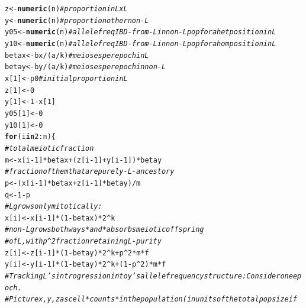 \documentclass{article}\usepackage[]{graphicx}\usepackage[]{color}
\makeatletter
\newcommand{\hlnum}[1]{\textcolor[rgb]{0.686,0.059,0.569}{#1}}%
\newcommand{\hlcom}[1]{\textcolor[rgb]{0.678,0.584,0.686}{\textit{#1}}}%
\newcommand{\hlopt}[1]{\textcolor[rgb]{0,0,0}{#1}}%
\newcommand{\hlstd}[1]{\textcolor[rgb]{0.345,0.345,0.345}{#1}}%
\newcommand{\hlkwa}[1]{\textcolor[rgb]{0.161,0.373,0.58}{\textbf{#1}}}%
\newcommand{\hlkwb}[1]{\textcolor[rgb]{0.69,0.353,0.396}{#1}}%
\newcommand{\hlkwd}[1]{\textcolor[rgb]{0.737,0.353,0.396}{\textbf{#1}}}%
\newenvironment{kframe}{%
 \def\at@end@of@kframe{}%
 \ifinner\ifhmode%
  \def\at@end@of@kframe{\end{minipage}}%
  \begin{minipage}{\columnwidth}%
 \fi\fi%
 \def\FrameCommand##1{\hskip\@totalleftmargin \hskip-\fboxsep
 \colorbox{shadecolor}{##1}\hskip-\fboxsep
     \hskip-\linewidth \hskip-\@totalleftmargin \hskip\columnwidth}%
 \MakeFramed {\advance\hsize-\width
   \@totalleftmargin\z@ \linewidth\hsize
   \@setminipage}}%
 {\par\unskip\endMakeFramed%
 \at@end@of@kframe}
\newenvironment{knitrout}{}{} %
\makeatother
\begin{document}
\begin{knitrout}
\begin{kframe}
\begin{alltt}
  \hlstd{z}   \hlkwb{<-} \hlkwd{numeric}\hlstd{(n)}    \hlcom{# proportion in LxL}
  \hlstd{y}   \hlkwb{<-} \hlkwd{numeric}\hlstd{(n)}    \hlcom{# proportion other non-L}
  \hlstd{y05} \hlkwb{<-} \hlkwd{numeric}\hlstd{(n)}    \hlcom{# allele freq IBD-from-L in non-L pop for a het position in L}
  \hlstd{y10} \hlkwb{<-} \hlkwd{numeric}\hlstd{(n)}    \hlcom{# allele freq IBD-from-L in non-L pop for a hom position in L}
  \hlstd{betax} \hlkwb{<-} \hlstd{bx}\hlopt{/}\hlstd{(a}\hlopt{/}\hlstd{k)}    \hlcom{# meioses per epoch in L}
  \hlstd{betay} \hlkwb{<-} \hlstd{by}\hlopt{/}\hlstd{(a}\hlopt{/}\hlstd{k)}    \hlcom{# meioses per epoch in non-L}
  \hlstd{x[}\hlnum{1}\hlstd{]}  \hlkwb{<-} \hlstd{p0}          \hlcom{# initial proportion in L}
  \hlstd{z[}\hlnum{1}\hlstd{]}  \hlkwb{<-} \hlnum{0}
  \hlstd{y[}\hlnum{1}\hlstd{]}  \hlkwb{<-} \hlnum{1}\hlopt{-}\hlstd{x[}\hlnum{1}\hlstd{]}
  \hlstd{y05[}\hlnum{1}\hlstd{]} \hlkwb{<-} \hlnum{0}
  \hlstd{y10[}\hlnum{1}\hlstd{]} \hlkwb{<-} \hlnum{0}
  \hlkwa{for}\hlstd{(i} \hlkwa{in} \hlnum{2}\hlopt{:}\hlstd{n)\{}
    \hlcom{# total meiotic fraction}
    \hlstd{m} \hlkwb{<-} \hlstd{x[i}\hlopt{-}\hlnum{1}\hlstd{]}\hlopt{*}\hlstd{betax} \hlopt{+} \hlstd{(z[i}\hlopt{-}\hlnum{1}\hlstd{]}\hlopt{+}\hlstd{y[i}\hlopt{-}\hlnum{1}\hlstd{])}\hlopt{*}\hlstd{betay}
    \hlcom{# fraction of them that are purely-L-ancestory}
    \hlstd{p} \hlkwb{<-} \hlstd{(x[i}\hlopt{-}\hlnum{1}\hlstd{]}\hlopt{*}\hlstd{betax} \hlopt{+} \hlstd{z[i}\hlopt{-}\hlnum{1}\hlstd{]}\hlopt{*}\hlstd{betay)}\hlopt{/}\hlstd{m}
    \hlstd{q} \hlkwb{<-} \hlnum{1}\hlopt{-}\hlstd{p}
    \hlcom{# L grows only mitotically:}
    \hlstd{x[i]}  \hlkwb{<-}  \hlstd{x[i}\hlopt{-}\hlnum{1}\hlstd{]}\hlopt{*}\hlstd{(}\hlnum{1}\hlopt{-}\hlstd{betax)}\hlopt{*}\hlnum{2}\hlopt{^}\hlstd{k}
    \hlcom{# non-L grows both ways *and* absorbs meiotic offspring }
    \hlcom{# of L, with p^2 fraction retaining L-purity}
    \hlstd{z[i]} \hlkwb{<-} \hlstd{z[i}\hlopt{-}\hlnum{1}\hlstd{]}\hlopt{*}\hlstd{(}\hlnum{1}\hlopt{-}\hlstd{betay)}\hlopt{*}\hlnum{2}\hlopt{^}\hlstd{k} \hlopt{+}    \hlstd{p}\hlopt{^}\hlnum{2}  \hlopt{*} \hlstd{m} \hlopt{*} \hlstd{f}
    \hlstd{y[i]} \hlkwb{<-} \hlstd{y[i}\hlopt{-}\hlnum{1}\hlstd{]}\hlopt{*}\hlstd{(}\hlnum{1}\hlopt{-}\hlstd{betay)}\hlopt{*}\hlnum{2}\hlopt{^}\hlstd{k} \hlopt{+} \hlstd{(}\hlnum{1}\hlopt{-}\hlstd{p}\hlopt{^}\hlnum{2}\hlstd{)} \hlopt{*} \hlstd{m} \hlopt{*} \hlstd{f}
    \hlcom{# Tracking L's introgression into y's allele frequency structure: Consider one epoch. }
    \hlcom{# Picture x,y,z as cell *counts* in the population (in units of the total pop size if }

\end{alltt}
\end{kframe}
\end{knitrout}
\end{document}
